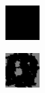 \documentclass[]{article}
\begin{document}
\begin{figure}[htb]
	\centering
	\begin{subfigure}[b]{.3\textwidth}
		\includegraphics[width=\textwidth]{figures/lattice1_1.png}
	\end{subfigure}
	\begin{subfigure}[b]{.3\textwidth}
		\includegraphics[width=\textwidth]{figures/lattice1_2.png}

\end{subfigure}
\end{figure}
\end{document}
